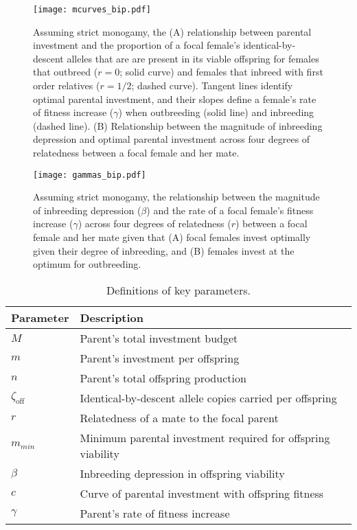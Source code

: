 \documentclass[12pt]{article}
\begin{document}
\clearpage
\begin{figure}
\begin{center}				
\texttt{[image: mcurves\_bip.pdf]}
\end{center}
\caption{Assuming strict monogamy, the (A) relationship between parental investment and the proportion of a focal female's identical-by-descent alleles that are are present in its viable offspring for females that outbreed ($r=0$; solid curve) and females that inbreed with first order relatives ($r=1/2$; dashed curve). Tangent lines identify optimal parental investment, and their slopes define a female's rate of fitness increase ($\gamma$) when outbreeding (solid line) and inbreeding (dashed line). (B) Relationship between the magnitude of inbreeding depression and optimal parental investment across four degrees of relatedness between a focal female and her mate.}
\label{mcurves_bip}
\end{figure}

\clearpage
\begin{figure}
\begin{center}				
\texttt{[image: gammas\_bip.pdf]}
\end{center}
\caption{Assuming strict monogamy, the relationship between the magnitude of inbreeding depression ($\beta$) and the rate of a focal female's fitness increase ($\gamma$) across four degrees of relatedness ($r$) between a focal female and her mate given that (A) focal females invest optimally given their degree of inbreeding, and (B) females invest at the optimum for outbreeding.}
\label{gammas_bip}
\end{figure}



\clearpage
\singlespacing
\begin{table}[H]
\begin{center}
\begin{tabular}{ll}
\hline
Parameter & Description & \\
\hline
$M$                     & Parent's total investment budget  & \\
$m$                     & Parent's investment per offspring & \\
$n$                     & Parent's total offspring production & \\
$\zeta_{\textrm{off}}$  & Identical-by-descent allele copies carried per offspring & \\
$r$                     & Relatedness of a mate to the focal parent & \\
$m_{min}$               & Minimum parental investment required for offspring viability & \\
$\beta$                 & Inbreeding depression in offspring viability & \\
$c$                     & Curve of parental investment with offspring fitness & \\
$\gamma$                & Parent's rate of fitness increase & \\
\hline	
\end{tabular}
\end{center}
\caption{Definitions of key parameters.}
\label{parameters}
\end{table}
\end{document}
